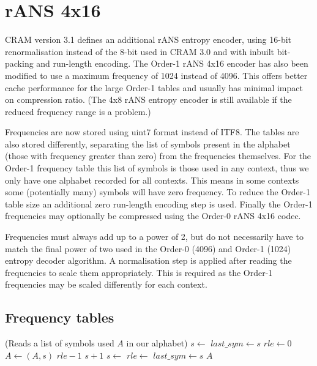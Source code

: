 \documentclass[a4paper]{article}
\begin{document}
\section{rANS 4x16}


CRAM version 3.1 defines an additional rANS entropy encoder, using
16-bit renormalisation instead of the 8-bit used in CRAM 3.0 and with
inbuilt bit-packing and run-length encoding.  The Order-1 rANS 4x16
encoder has also been modified to use a maximum frequency of 1024
instead of 4096.  This offers better cache performance for the large
Order-1 tables and usually has minimal impact on compression ratio.
(The 4x8 rANS entropy encoder is still available if the reduced
frequency range is a problem.)

Frequencies are now stored using uint7 format instead of ITF8.  The
tables are also stored differently, separating the list of symbols
present in the alphabet (those with frequency greater than zero) from
the frequencies themselves.  For the Order-1 frequency table this list
of symbols is those used in any context, thus we only have one
alphabet recorded for all contexts.  This means in some contexts
some (potentially many) symbols will have zero frequency.  To reduce
the Order-1 table size an additional zero run-length encoding step is
used.  Finally the Order-1 frequencies may optionally be compressed
using the Order-0 rANS 4x16 codec.

Frequencies must always add up to a power of 2, but do not necessarily
have to match the final power of two used in the Order-0 (4096) and
Order-1 (1024) entropy decoder algorithm.  A normalisation step is
applied after reading the frequencies to scale them appropriately.
This is required as the Order-1 frequencies may be scaled differently
for each context.

\subsection{Frequency tables}

\begin{algorithmic}[1]
\Statex (Reads a list of symbols used $A$ in our alphabet)
\State $s \gets$ 
\State $last\_sym \gets s$
\State $rle \gets 0$
\Repeat
  \State $A \gets (A,s)$ 
    \settowidth{\maxwidth}{rle\ }
    \State {} $rle-1$
    \State {} $s+1$
  \Else
    \State $s \gets$ 
      \State $rle \gets$ 
    \EndIf
  \EndIf
  \State $last\_sym \gets s$
\State \Return $A$
\EndFunction
\end{algorithmic}
\end{document}
